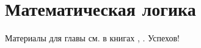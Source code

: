 \chapter{Математическая логика}

Материалы для главы см. в книгах \cite{galiev2002}, \cite{kolmogorov2006}. Успехов!
